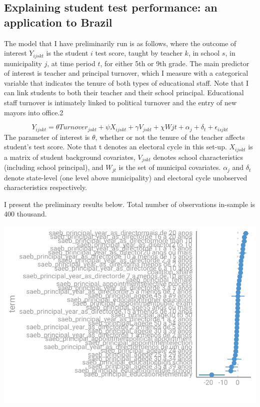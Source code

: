 \documentclass[12pt,]{article}
\begin{document}
\hypertarget{explaining-student-test-performance-an-application-to-brazil}{%
\subsection{Explaining student test performance: an application to
Brazil}\label{explaining-student-test-performance-an-application-to-brazil}}

The model that I have preliminarily run is as follows, where the outcome
of interest \(Y_{ijskt}\) is the student \(i\) test score, taught by
teacher \(k\), in school \(s\), in municipality \(j\), at time period
\(t\), for either 5th or 9th grade. The main predictor of interest is
teacher and principal turnover, which I measure with a categorical
variable that indicates the tenure of both types of educational staff.
Note that I can link students to both their teacher and their school
principal. Educational staff turnover is intimately linked to political
turnover and the entry of new mayors into office.2

\[Y_{ijskt} = \theta Turnover_{jskt} +\psi X_{ijskt} + \gamma V_{jskt} +\chi Wjt+ \alpha_j + \delta_t+ \epsilon_{isjkt}\]
The parameter of interest is \(\theta\), whether or not the tenure of
the teacher affects student's test score. Note that t denotes an
electoral cycle in this set-up. \(X_{ijskt}\) is a matrix of student
background covariates, \(V_{jskt}\) denotes school characteristics
(including school principal), and \(W_{jt}\) is the set of municipal
covariates. \(\alpha_j\) and \(\delta_t\) denote state-level (one level
above municipality) and electoral cycle unobserved characteristics
respectively.

I present the preliminary results below. Total number of observations
in-sample is 400 thousand.

\begin{center}\includegraphics{dissertation_files/figure-latex/graphs-1} \end{center}
\end{document}
